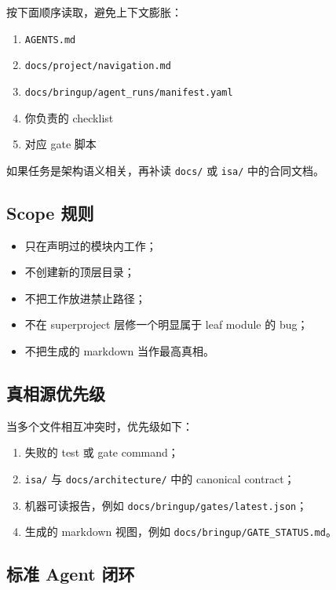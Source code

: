 \documentclass[UTF8,11pt,a4paper]{ctexart}
\begin{document}
按下面顺序读取，避免上下文膨胀：

\begin{enumerate}
  \item \texttt{AGENTS.md}
  \item \texttt{docs/project/navigation.md}
  \item \texttt{docs/bringup/agent\_runs/manifest.yaml}
  \item 你负责的 checklist
  \item 对应 gate 脚本
\end{enumerate}

如果任务是架构语义相关，再补读 \texttt{docs/} 或 \texttt{isa/} 中的合同文档。

\subsection{Scope 规则}

\begin{itemize}
  \item 只在声明过的模块内工作；
  \item 不创建新的顶层目录；
  \item 不把工作放进禁止路径；
  \item 不在 superproject 层修一个明显属于 leaf module 的 bug；
  \item 不把生成的 markdown 当作最高真相。
\end{itemize}

\subsection{真相源优先级}

当多个文件相互冲突时，优先级如下：

\begin{enumerate}
  \item 失败的 test 或 gate command；
  \item \texttt{isa/} 与 \texttt{docs/architecture/} 中的 canonical contract；
  \item 机器可读报告，例如 \texttt{docs/bringup/gates/latest.json}；
  \item 生成的 markdown 视图，例如 \texttt{docs/bringup/GATE\_STATUS.md}。
\end{enumerate}

\subsection{标准 Agent 闭环}
\end{document}
